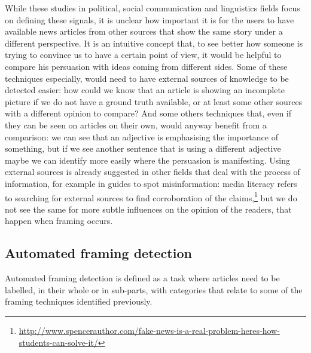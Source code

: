 While these studies in political, social communication and linguistics fields focus on defining these signals, it is unclear how important it is for the users to have available news articles from other sources that show the same story under a different perspective.
It is an intuitive concept that, to see better how someone is trying to convince us to have a certain point of view, it would be helpful to compare his persuasion with ideas coming from different sides.
Some of these techniques especially, would need to have external sources of knowledge to be detected easier: how could we know that an article is showing an incomplete picture if we do not have a ground truth available, or at least some other sources with a different opinion to compare?
And some others techniques that, even if they can be seen on articles on their own, would anyway benefit from a comparison: we can see that an adjective is emphasising the importance of something, but if we see another sentence that is using a different adjective maybe we can identify more easily where the persuasion is manifesting.
Using external sources is already suggested in other fields that deal with the process of information, for example in guides to spot misinformation: media literacy refers to searching for external sources to find corroboration of the claims,\footnote{\url{http://www.spencerauthor.com/fake-news-is-a-real-problem-heres-how-students-can-solve-it/}} but we do not see the same for more subtle influences on the opinion of the readers, that happen when framing occurs.


\subsection{Automated framing detection}
\label{ssec:lit_framing_auto}

Automated framing detection is defined as a task where articles need to be labelled, in their whole or in sub-parts, with categories that relate to some of the framing techniques identified previously.


